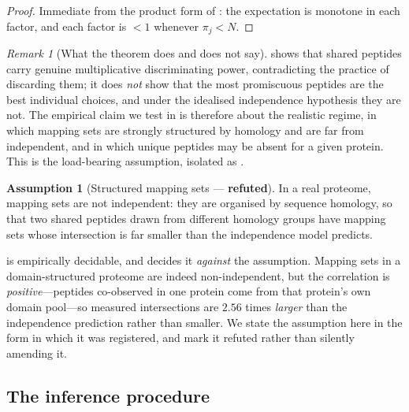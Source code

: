\documentclass[11pt,a4paper]{article}
\theoremstyle{definition}
\newtheorem{assumption}[theorem]{Assumption}
\theoremstyle{remark}
\newtheorem{remark}[theorem]{Remark}
\begin{document}
\begin{proof}
Immediate from the product form of : the expectation
is monotone in each factor, and each factor is $<1$ whenever
$\pi_j<N$.
\end{proof}

\begin{remark}[What the theorem does and does not say]
\label{rem:collapse-honest}
 shows that shared peptides carry genuine
multiplicative discriminating power, contradicting the practice of
discarding them; it does \emph{not} show that the most promiscuous
peptides are the best individual choices, and under the idealised
independence hypothesis they are not. The empirical claim we test in
 is therefore about the realistic regime, in which
mapping sets are strongly structured by homology and are far from
independent, and in which unique peptides may be absent for a given
protein. This is the load-bearing assumption, isolated as
.
\end{remark}

\begin{assumption}[Structured mapping sets --- \textbf{refuted}]
\label{ass:structure}
In a real proteome, mapping sets are not independent: they are organised
by sequence homology, so that two shared peptides drawn from different
homology groups have mapping sets whose intersection is far smaller than
the independence model predicts.
\end{assumption}

 is empirically decidable, and 
decides it \emph{against} the assumption. Mapping sets in a
domain-structured proteome are indeed non-independent, but the
correlation is \emph{positive}---peptides co-observed in one protein
come from that protein's own domain pool---so measured intersections are
$2.56$ times \emph{larger} than the independence prediction rather than
smaller. We state the assumption here in the form in which it was
registered, and mark it refuted rather than silently amending it.

\subsection{The inference procedure}
\end{document}
